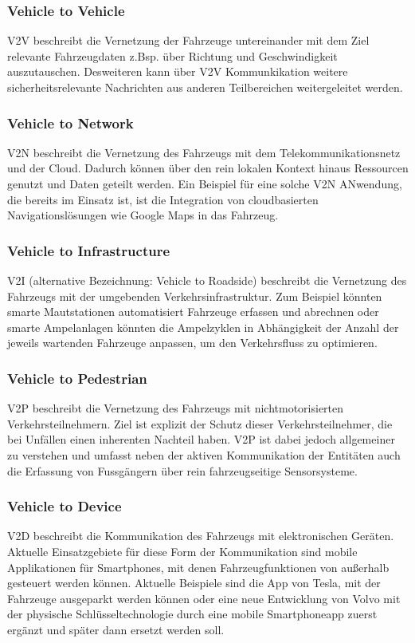     \subsubsection{Vehicle to Vehicle}
    V2V beschreibt die Vernetzung der Fahrzeuge untereinander mit dem Ziel relevante Fahrzeugdaten z.Bsp. über Richtung und Geschwindigkeit auszutauschen.
    Desweiteren kann über V2V Kommunkikation weitere sicherheitsrelevante Nachrichten aus anderen Teilbereichen weitergeleitet werden.

    \subsubsection{Vehicle to Network}
    V2N beschreibt die Vernetzung des Fahrzeugs mit dem Telekommunikationsnetz und der Cloud. Dadurch können über den
    rein lokalen Kontext hinaus Ressourcen genutzt und Daten geteilt werden. Ein Beispiel für eine solche V2N ANwendung, die bereits
    im Einsatz ist, ist die Integration von cloudbasierten Navigationslösungen wie Google Maps in das Fahrzeug.
    
    \subsubsection{Vehicle to Infrastructure}
    V2I (alternative Bezeichnung: Vehicle to Roadside) beschreibt die Vernetzung des Fahrzeugs mit der umgebenden Verkehrsinfrastruktur. Zum Beispiel könnten smarte
    Mautstationen automatisiert Fahrzeuge erfassen und abrechnen oder smarte Ampelanlagen könnten die Ampelzyklen in Abhängigkeit
    der Anzahl der jeweils wartenden Fahrzeuge anpassen, um den Verkehrsfluss zu optimieren. 

    \subsubsection{Vehicle to Pedestrian}
    V2P beschreibt die Vernetzung des Fahrzeugs mit nichtmotorisierten Verkehrsteilnehmern. Ziel ist explizit der
    Schutz dieser Verkehrsteilnehmer, die bei Unfällen einen inherenten Nachteil haben. V2P ist dabei jedoch allgemeiner
    zu verstehen und umfasst neben der aktiven Kommunikation der Entitäten auch die Erfassung von Fussgängern über rein
    fahrzeugseitige Sensorsysteme.

    \subsubsection{Vehicle to Device}
    V2D beschreibt die Kommunikation des Fahrzeugs mit elektronischen Geräten. Aktuelle Einsatzgebiete für diese Form der Kommunikation
    sind mobile Applikationen für Smartphones, mit denen Fahrzeugfunktionen von außerhalb gesteuert werden können. Aktuelle Beispiele
    sind die App von Tesla, mit der Fahrzeuge ausgeparkt werden können oder eine neue Entwicklung von Volvo mit der physische Schlüsseltechnologie
    durch eine mobile Smartphoneapp zuerst ergänzt und später dann ersetzt werden soll. ~\cite{.BP05}
     
